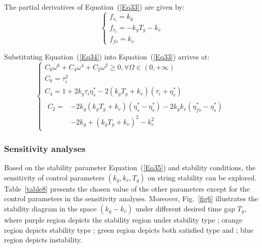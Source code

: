 \documentclass[journal]{IEEEtran}
\begin{document}
The partial derivatives of Equation~(\ref{Eq33}) are given by:
\begin{equation}
  \left\{\begin{array}{l}
    f_{s_{i}}=k_{g}              \\
    f_{v_{i}}=-k_{g} T_{g}-k_{v} \\
    f_{f v}=k_{v}
  \end{array}\right.
  \label{Eq34}
\end{equation}

Substituting Equation~(\ref{Eq34}) into Equation~(\ref{Eq33}) arrives at:
\begin{equation}
  \left\{\begin{array}{l}
    C_{6} \omega^{6}+C_{4} \omega^{4}+C_{2} \omega^{2} \geq 0, \forall \Omega \in(0,+\infty)                \\
    C_{6}=\tau_{i}^{2}                                                                                      \\
    C_{4}=1+2 k_{g} \tau_{i} \eta_{s}^{*}-2\left(k_{g} T_{g}+k_{v}\right)\left(\tau_{i}+\eta_{v}^{*}\right) \\
    \begin{aligned}
      C_{2}= & -2 k_{g}\left(k_{g} T_{g}+k_{v}\right)\left(\eta_{s}^{*}-\eta_{v}^{*}\right)-2 k_{g} k_{v}\left(\eta_{f v}^{*}-\eta_{s}^{*}\right) \\
             & -2 k_{g}+\left(k_{g} T_{g}+k_{v}\right)^{2}-k_{v}^{2}
    \end{aligned}
  \end{array}\right.
  \label{Eq35}
\end{equation}

\subsubsection{Sensitivity analyses}
\label{Section 4.3.4}

Based on the stability parameter Equation~(\ref{Eq35}) and stability conditions, the sensitivity of control parameters $(k_g,k_v,T_g)$ on string stability can be explored. Table~\ref{table8} presents the chosen value of the other parameters except for the control parameters in the sensitivity analyses. Moreover, Fig.~\ref{fig6} illustrates the stability diagram in the space $(k_g-k_v)$ under different desired time gap $T_g$, where purple region depicts the stability region under stability type \uppercase\expandafter{}; orange region depicts stability type \uppercase\expandafter{}; green region depicts both satisfied type \uppercase\expandafter{} and \uppercase\expandafter{}; blue region depicts instability.
\end{document}

